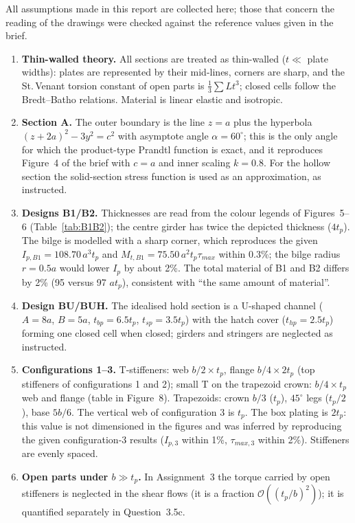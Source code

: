 All assumptions made in this report are collected here; those that concern the reading of the drawings were checked against the reference values given in the brief.
\begin{enumerate}[label=A\arabic*., leftmargin=*]
  \item \textbf{Thin-walled theory.} All sections are treated as thin-walled ($t\ll$ plate widths): plates are represented by their mid-lines, corners are sharp, and the St.\,Venant torsion constant of open parts is $\frac13\sum Lt^3$; closed cells follow the Bredt--Batho relations. Material is linear elastic and isotropic.
  \item \textbf{Section A.} The outer boundary is the line $z=a$ plus the hyperbola $(z+2a)^2-3y^2=c^2$ with asymptote angle $\alpha=60^\circ$; this is the only angle for which the product-type Prandtl function is exact, and it reproduces Figure~4 of the brief with $c=a$ and inner scaling $k=0.8$. For the hollow section the solid-section stress function is used as an approximation, as instructed.
  \item \textbf{Designs B1/B2.} Thicknesses are read from the colour legends of Figures~5--6 (Table~\ref{tab:B1B2}); the centre girder has twice the depicted thickness ($4t_p$). The bilge is modelled with a sharp corner, which reproduces the given $I_{p,B1}=108.70\,a^3t_p$ and $M_{t,B1}=75.50\,a^2t_p\tau_{max}$ within 0.3\%; the bilge radius $r=0.5a$ would lower $I_p$ by about 2\%. The total material of B1 and B2 differs by 2\% (95 versus 97 $at_p$), consistent with ``the same amount of material''.
  \item \textbf{Design BU/BUH.} The idealised hold section is a U-shaped channel ($A=8a$, $B=5a$, $t_{bp}=6.5t_p$, $t_{sp}=3.5t_p$) with the hatch cover ($t_{hp}=2.5t_p$) forming one closed cell when closed; girders and stringers are neglected as instructed.
  \item \textbf{Configurations 1--3.} T-stiffeners: web $b/2\times t_p$, flange $b/4\times2t_p$ (top stiffeners of configurations 1 and 2); small T on the trapezoid crown: $b/4\times t_p$ web and flange (table in Figure~8). Trapezoids: crown $b/3$ ($t_p$), $45^\circ$ legs ($t_p/2$), base $5b/6$. The vertical web of configuration 3 is $t_p$. The box plating is $2t_p$: this value is not dimensioned in the figures and was inferred by reproducing the given configuration-3 results ($I_{p,3}$ within 1\%, $\tau_{max,3}$ within 2\%). Stiffeners are evenly spaced.
  \item \textbf{Open parts under $b\gg t_p$.} In Assignment~3 the torque carried by open stiffeners is neglected in the shear flows (it is a fraction $\mathcal O((t_p/b)^2)$); it is quantified separately in Question~3.5c.

\end{enumerate}

